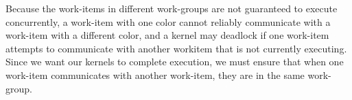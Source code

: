 Because the work-items in different work-groups are not guaranteed to execute concurrently, a work-item with one color cannot reliably communicate with a work-item with a different color, and a kernel may deadlock if one work-item attempts to communicate with another workitem that is not currently executing. Since we want our kernels to complete execution, we must ensure that when one work-item communicates with another work-item, they are in the same work-group.\par















































